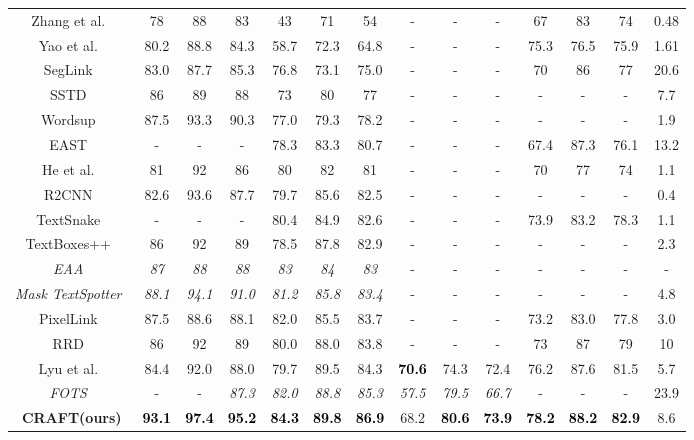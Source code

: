 \documentclass[10pt,twocolumn,letterpaper]{article}
\begin{document}
\begin{table*}[t!]
\begin{tabular}{c||c|c|c||c|c|c||c|c|c||c|c|c||c}
    \rule{0pt}{10pt}
    Zhang et al.~\cite{zhang2016multi} & 78 & 88 & 83 & 43 & 71 & 54 & - & - & - & 67 & 83 & 74 & 0.48 \\ 
    Yao et al.~\cite{yao2016scene} & 80.2 & 88.8 & 84.3 & 58.7 & 72.3 & 64.8 & - & - & - & 75.3 & 76.5 & 75.9 & 1.61 \\ 
    SegLink~\cite{shi2017detecting}&83.0&87.7&85.3&76.8&73.1&75.0&-&-&- & 70 & 86 & 77 & 20.6\\
    SSTD~\cite{he2017single}&86&89&88&73&80&77&-&-&- & - & - & - & 7.7 \\
    Wordsup~\cite{hu2017wordsup}&87.5&93.3&90.3&77.0&79.3&78.2&-&-&- & - & - & - & 1.9\\
    EAST~\cite{zhou2017east}&-&-&-&78.3&83.3&80.7&-&-&- & 67.4 & 87.3 & 76.1 & 13.2\\
    He et al.~\cite{he2017deep} & 81 & 92 & 86 & 80 & 82 & 81 & - & - & - & 70 & 77 & 74 & 1.1 \\
    R2CNN~\cite{jiang2017r2cnn} &82.6&93.6&87.7&79.7&85.6&82.5&-&-&- & - & - & - & 0.4\\ 
    TextSnake~\cite{long2018textsnake} & - & - & - & 80.4 & 84.9 & 82.6 & - & - & - & 73.9 & 83.2 &	78.3 & 1.1 \\
    TextBoxes++~\cite{liao2018textboxes++} & 86 & 92 & 89 & 78.5 & 87.8 & 82.9 & - & - & - & - & - & - & 2.3\\ 
\textit{EAA}~\cite{he2018end} & \textit{87} & \textit{88} & \textit{88} & \textit{83} & \textit{84} & \textit{83} & - & - & - & - & - & - & -\\ 
    \textit{Mask TextSpotter}~\cite{lyu2018mask} & \textit{88.1} & \textit{94.1} & \textit{91.0} & \textit{81.2} & \textit{85.8} & \textit{83.4} & - & -&  - & - & - & - & 4.8\\ 
    PixelLink~\cite{deng2018pixellink} & 87.5 & 88.6 & 88.1 & 82.0 & 85.5 & 83.7 & - & - & - & 73.2 &  83.0 &	77.8 &	3.0 \\
    RRD~\cite{liao2018rotation} & 86 & 92 & 89 & 80.0 & 88.0 & 83.8 & - & - & - & 73 & 87 & 79 & 10\\ 
    Lyu et al.~\cite{lyu2018multi} & 84.4 & 92.0 & 88.0 & 79.7 & 89.5 & 84.3 & \textcolor{black}{\textbf{70.6}} & 74.3 & 72.4 & 76.2 & 87.6 & 81.5 & 5.7\\ 
    \textit{FOTS}~\cite{liu2018fots} & - & - & \textit{87.3} & \textit{82.0} & \textit{88.8} & \textit{85.3} & \textit{57.5} & \textit{79.5} & \textit{66.7} & - & - & - & 23.9\\ 
\hline
    \hline
    \rule{0pt}{10pt} \textbf{CRAFT(ours)} & \textcolor{black}{\textbf{93.1}} & \textcolor{black}{\textbf{97.4}} & \textcolor{black}{\textbf{95.2}} & \textcolor{black}{\textbf{84.3}} & \textcolor{black}{\textbf{89.8}} & \textcolor{black}{\textbf{86.9}} & 68.2 & \textcolor{black}{\textbf{80.6}} & \textcolor{black}{\textbf{73.9}} & \textcolor{black}{\textbf{78.2}} & \textcolor{black}{\textbf{88.2}} & \textcolor{black}{\textbf{82.9}} & 8.6\\

\end{tabular}
\end{table*}
\end{document}
